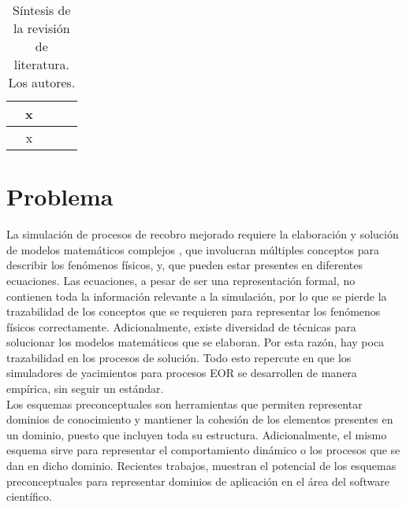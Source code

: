 \begin{table}[h]
\begin{tabular}{|l|l|l|l|l|}
		\cite{Hu2013}                                   & \multicolumn{1}{c|}{x}                                         & \multicolumn{1}{c|}{}                                               & \multicolumn{1}{c|}{}                                              & \multicolumn{1}{c|}{}                                               \\ \hline
		\cite{ZAYDULLIN201451}                                   & \multicolumn{1}{c|}{x}                                         & \multicolumn{1}{c|}{}                                               & \multicolumn{1}{c|}{}                                              & \multicolumn{1}{c|}{}                                               \\ \hline
		
	\end{tabular}
\caption[Síntesis de la revisión de literatura.]{Síntesis de la revisión de literatura. Los autores.}
\label{tab:LitReview}
\end{table}



\section{Problema}

La simulación de procesos de recobro mejorado requiere la elaboración y solución de modelos matemáticos complejos \citep{ertekin2001basic}, que involucran múltiples conceptos para describir los fenómenos físicos, y, que pueden estar presentes en diferentes ecuaciones. Las ecuaciones, a pesar de ser una representación formal, no contienen toda la información relevante a la simulación, por lo que se pierde la trazabilidad de los conceptos que se requieren para representar los fenómenos físicos correctamente. Adicionalmente, existe diversidad de técnicas para solucionar los modelos matemáticos que se elaboran. Por esta razón, hay poca trazabilidad en los procesos de solución. Todo esto repercute en que los simuladores de yacimientos para procesos EOR se desarrollen de manera empírica, sin seguir un estándar.\\

Los esquemas preconceptuales son herramientas que permiten representar dominios de conocimiento y mantiener la cohesión de los elementos presentes en un dominio, puesto que incluyen toda su estructura. Adicionalmente, el mismo esquema sirve para representar el comportamiento dinámico o los procesos que se dan en dicho dominio. Recientes trabajos, muestran el potencial de los esquemas preconceptuales para representar dominios de aplicación en el área del software científico.\\

